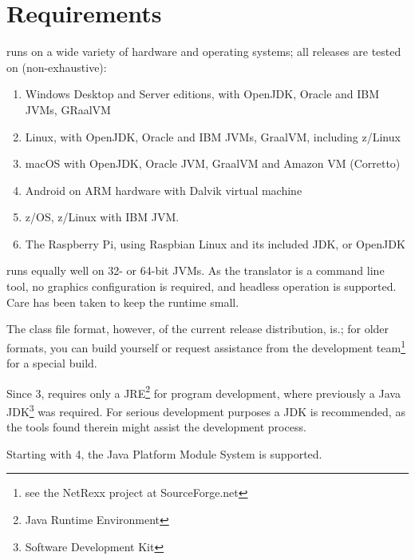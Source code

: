 \chapter{Requirements}
\nr{}  runs on a wide variety of
hardware and operating systems; all releases are tested on (non-exhaustive):
\begin{enumerate}
\item Windows Desktop and Server editions, with OpenJDK, Oracle and
  IBM JVMs, GRaalVM
\item Linux, with OpenJDK, Oracle and IBM JVMs, GraalVM, including z/Linux
\item macOS with OpenJDK,  Oracle JVM, GraalVM and Amazon VM (Corretto)
\item Android on ARM hardware with Dalvik virtual machine
\item z/OS, z/Linux with IBM JVM.
\item The Raspberry Pi, using Raspbian Linux and its included JDK, or OpenJDK
\end{enumerate}
\nr{} runs equally well on 32- or 64-bit JVMs. As the translator is
a command line tool, no graphics configuration is required, and
headless operation is supported. Care has been taken to keep the \nr{} runtime small.

The class file format, however, of the current release distribution,
is.; for older formats, you
can build \nr{} yourself or request assistance from the development
team\footnote{see the NetRexx project at SourceForge.net} for a special build.
\begin{shaded}\noindent
Since \nr{} 3, \nr{} requires only a
JRE\footnote{Java Runtime Environment} for program development, where previously a
Java JDK\footnote{Software Development Kit} was required. For serious development
purposes a JDK is recommended, as the tools found therein might
assist the development process.
\end{shaded}\indent

\begin{shaded}\noindent
Starting with \nr{} 4, the Java Platform Module System is supported.
\end{shaded}\indent

